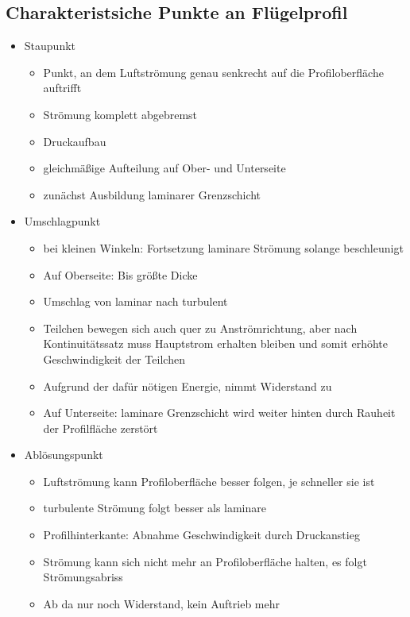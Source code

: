 \documentclass[a4paper,10pt]{scrartcl}
\begin{document}
			\subsection{Charakteristsiche Punkte an Flügelprofil}
				\begin{itemize}
					\item Staupunkt
					\begin{itemize}
						\item Punkt, an dem Luftströmung genau senkrecht auf die Profiloberfläche
						auftrifft
						\item Strömung komplett abgebremst
						\item Druckaufbau
						\item gleichmäßige Aufteilung auf Ober- und Unterseite
						\item zunächst Ausbildung laminarer Grenzschicht
					\end{itemize}
					\item Umschlagpunkt
					\begin{itemize}
						\item bei kleinen Winkeln: Fortsetzung laminare Strömung solange beschleunigt
						\item Auf Oberseite: Bis größte Dicke
						\item Umschlag von laminar nach turbulent
						\item Teilchen bewegen sich auch quer zu Anströmrichtung, aber nach Kontinuitätssatz muss Hauptstrom erhalten bleiben und somit erhöhte Geschwindigkeit der Teilchen
						\item Aufgrund der dafür nötigen Energie, nimmt Widerstand zu 
						\item Auf Unterseite: laminare Grenzschicht wird weiter hinten durch Rauheit der Profilfläche zerstört 
					\end{itemize}
					\item Ablösungspunkt
					\begin{itemize}
						\item Luftströmung kann Profiloberfläche besser folgen, je schneller sie ist
						\item turbulente Strömung folgt besser als laminare
						\item Profilhinterkante: Abnahme Geschwindigkeit durch Druckanstieg
						\item Strömung kann sich nicht mehr an Profiloberfläche halten, es folgt Strömungsabriss
						\item Ab da nur noch Widerstand, kein Auftrieb mehr
					\end{itemize}
				\end{itemize}
				
\end{document}
